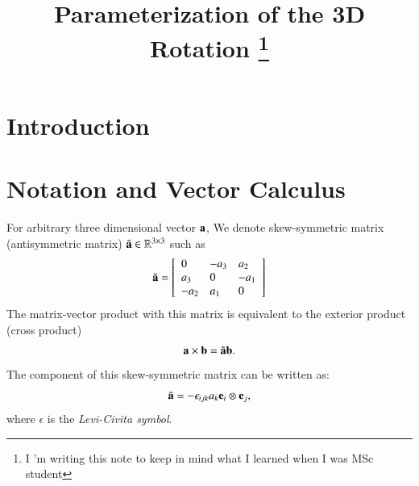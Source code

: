 

\title{Parameterization of the 3D Rotation \footnote{I 'm writing this note to keep in mind what I learned when I was MSc student}}


\maketitle
\tableofcontents


\section{Introduction}


\section{Notation and Vector Calculus}

For arbitrary three dimensional vector $\mathbf{a}$, We denote skew-symmetric matrix (antisymmetric matrix) $\tilde{\mathbf{a}}\in\mathbb{R}^{3\times 3}$ such as
%
\begin{eqnarray}
\tilde{\mathbf{a}}=\left[\begin{array}{lll}0 & -a_3 & a_2 \\ a_3 & 0 & -a_1 \\ -a_2 & a_1 & 0 \end{array}\right]
\end{eqnarray}
%
The matrix-vector product with this matrix is equivalent to the exterior product (cross product)
%
\begin{equation}
\mathbf{a}\times\mathbf{b} = \tilde{\mathbf{a}}\mathbf{b}.
\end{equation}
%
The component of this skew-symmetric matrix can be written as:
\begin{equation}
\tilde{\mathbf{a}} = -\epsilon_{ijk}a_k \mathbf{e}_i\otimes\mathbf{e}_j,
\end{equation}
%
where $\epsilon$ is the \emph{Levi-Civita symbol}.

